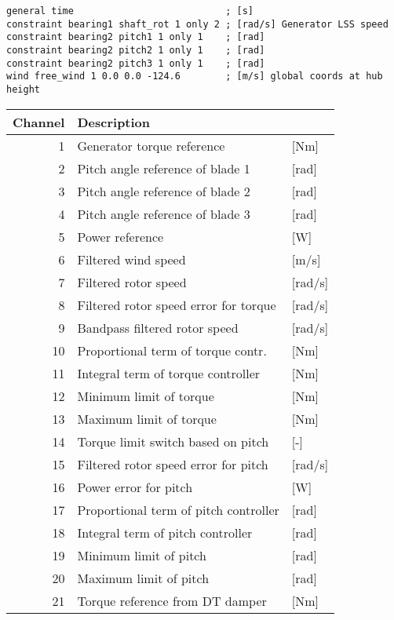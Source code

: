 \begin{table}[b]
\center \scriptsize
\begin{verbatim}
general time                           ; [s]
constraint bearing1 shaft_rot 1 only 2 ; [rad/s] Generator LSS speed
constraint bearing2 pitch1 1 only 1    ; [rad]
constraint bearing2 pitch2 1 only 1    ; [rad]
constraint bearing2 pitch3 1 only 1    ; [rad]
wind free_wind 1 0.0 0.0 -124.6        ; [m/s] global coords at hub height
\end{verbatim}
\end{table}


\begin{table}[b]
\center
\begin{tabular}{r|ll}
Channel & Description \\ \hline
 1& Generator torque reference            &[Nm]\\
 2& Pitch angle reference of blade 1      &[rad]\\
 3& Pitch angle reference of blade 2      &[rad]\\
 4& Pitch angle reference of blade 3      &[rad]\\
 5& Power reference                       &[W]\\
 6& Filtered wind speed                   &[m/s]\\
 7& Filtered rotor speed                  &[rad/s]\\
 8& Filtered rotor speed error for torque &[rad/s]\\
 9& Bandpass filtered rotor speed         &[rad/s]\\
10& Proportional term of torque contr.    &[Nm]\\
11& Integral term of torque controller    &[Nm]\\
12& Minimum limit of torque               &[Nm]\\
13& Maximum limit of torque               &[Nm]\\
14& Torque limit switch based on pitch    &[-]\\
15& Filtered rotor speed error for pitch  &[rad/s]\\
16& Power error for pitch                 &[W]\\
17& Proportional term of pitch controller &[rad]\\
18& Integral term of pitch controller     &[rad]\\
19& Minimum limit of pitch                &[rad]\\
20& Maximum limit of pitch                &[rad]\\
21& Torque reference from DT damper       &[Nm]
\end{tabular}
\end{table}

